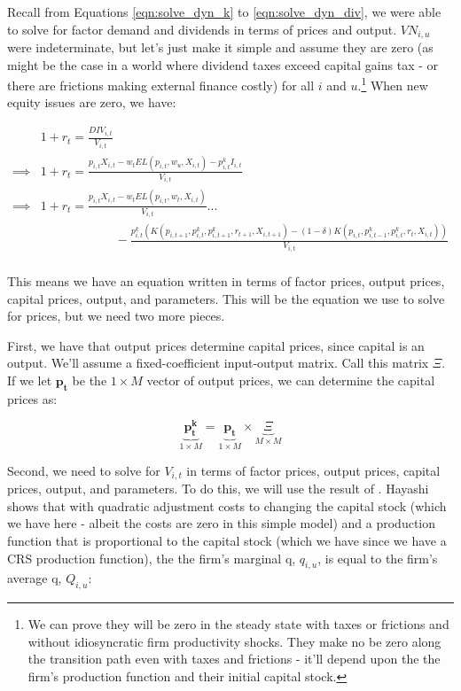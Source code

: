 \documentclass[letterpaper,12pt]{article}
\theoremstyle{definition}
\begin{document}
\begin{spacing}{1.5}
Recall from Equations \ref{eqn:solve_dyn_k} to \ref{eqn:solve_dyn_div}, we were able to solve for factor demand and dividends in terms of prices and output.  $VN_{i,u}$ were indeterminate, but let's just make it simple and assume they are zero (as might be the case in a world where dividend taxes exceed capital gains tax - or there are frictions making external finance costly) for all $i$ and $u$.\footnote{We can prove they will be zero in the steady state with taxes or frictions and without idiosyncratic firm productivity shocks.  They make no be zero along the transition path even with taxes and frictions - it'll depend upon the the firm's production function and their initial capital stock.}  When new equity issues are zero, we have:

\begin{equation}
\label{eqn:price_det}
\begin{split}
& 1+r_{t} = \frac{DIV_{i,t}}{V_{i,t}} \\
\implies &  1+r_{t} = \frac{ p_{i,t}X_{i,t} - w_{t}EL(p_{i,t},w_{u},X_{i,t}) - p^{k}_{i,t}I_{i,t}}{V_{i,t}} \\
\implies &  1+r_{t} = \frac{ p_{i,t}X_{i,t} - w_{t}EL(p_{i,t},w_{t},X_{i,t})}{V_{i,t}}... \\
 & \quad\quad\quad\quad\quad\quad - \frac{p^{k}_{i,t}(K(p_{i,t+1},p^{k}_{i,t},p^{k}_{i,t+1},r_{t+1},X_{i,t+1}) - (1-\delta)K(p_{i,t},p^{k}_{i,t-1},p^{k}_{i,t},r_{t},X_{i,t}))}{V_{i,t}} \\
\end{split}
\end{equation}


This means we have an equation written in terms of factor prices, output prices, capital prices, output, and parameters.  This will be the equation we use to solve for prices, but we need two more pieces. 

First, we have that output prices determine capital prices, since capital is an output.  We'll assume a fixed-coefficient input-output matrix.  Call this matrix $\Xi$.  If we let $\boldsymbol{p_{t}}$ be the $1\times M$ vector of output prices, we can determine the capital prices as:

\begin{equation}
\label{eqn:capital_prices}
\underbrace{\boldsymbol{p^{k}_{t}}}_{1\times M} =\underbrace{\boldsymbol{p_{t}}}_{1\times M} \times  \underbrace{\Xi}_{M\times M}
\end{equation}

Second, we need to solve for $V_{i,t}$ in terms of factor prices, output prices, capital prices, output, and parameters.  To do this, we will use the result of \citet{Hayashi1982}.  Hayashi shows that with quadratic adjustment costs to changing the capital stock (which we have here - albeit the costs are zero in this simple model) and a production function that is proportional to the capital stock (which we have since we have a CRS production function), the the firm's marginal q, $q_{i,u}$, is equal to the firm's average q, $Q_{i,u}$:


\end{spacing}
\end{document}
